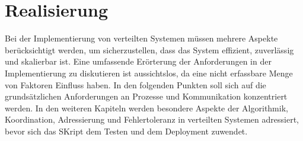 \section{Realisierung}
Bei der Implementierung von verteilten Systemen müssen mehrere Aspekte berücksichtigt werden, um sicherzustellen, dass das System effizient, zuverlässig und skalierbar ist. Eine umfassende Erörterung der Anforderungen in der Implementierung zu diskutieren ist aussichtslos, da eine nicht erfassbare Menge von Faktoren Einfluss haben. In den folgenden Punkten soll sich auf die grundsätzlichen Anforderungen an Prozesse und Kommunikation konzentriert werden. In den weiteren Kapiteln werden besondere Aspekte der Algorithmik, Koordination, Adressierung und Fehlertoleranz in verteilten Systemen adressiert, bevor sich das SKript dem Testen und  dem Deployment zuwendet. 

